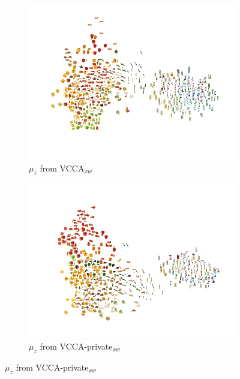 
\begin{figure}[!tp]
     \centering
     \begin{subfigure}[b]{0.49\textwidth}
         \centering
         \includegraphics[width=\textwidth]{PaperB/figures_and_tables/latent_space_visualizations/pca_latents_vcca_xw_seed2.png}
         \caption{$\mu_{z}$ from VCCA$_{x w}$}
         \label{fig:pca_vcca_xw_z}
     \end{subfigure} 
     \begin{subfigure}[b]{0.49\textwidth}
         \centering
         \includegraphics[width=\textwidth]{PaperB/figures_and_tables/private_latent_space_visualizations/pca_z_vaecca_private_xw_seed1.png}
         \caption{$\mu_{z}$ from VCCA-private$_{x w}$}

\end{subfigure}
\end{figure}
